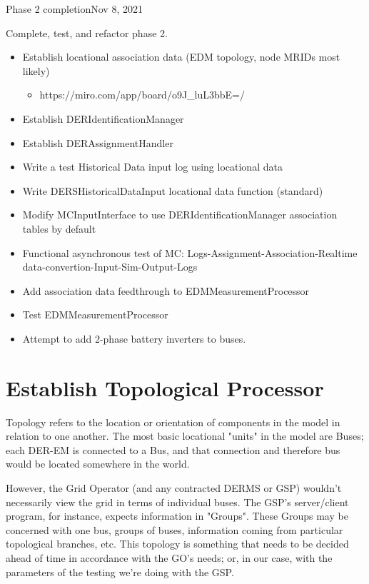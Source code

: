 \begin{entry}{Phase 2 completion}{Nov 8, 2021}
    \objective 
    
    Complete, test, and refactor phase 2.


    \outline

    \begin{itemize}
        \item Establish locational association data (EDM topology, node MRIDs most likely)
        \begin{itemize}
            \item https://miro.com/app/board/o9J_luL3bbE=/
        \end{itemize}
        \item Establish DERIdentificationManager
        \item Establish DERAssignmentHandler
        \item Write a test Historical Data input log using locational data
        \item Write DERSHistoricalDataInput locational data function (standard)
        \item Modify MCInputInterface to use DERIdentificationManager association tables by default
        \item Functional asynchronous test of MC: Logs-Assignment-Association-Realtime data-convertion-Input-Sim-Output-Logs
        \item Add association data feedthrough to EDMMeasurementProcessor
        \item Test EDMMeasurementProcessor
        \item Attempt to add 2-phase battery inverters to buses.
    \end{itemize}

    \procedures

    \section*{Establish Topological Processor}
    Topology refers to the location or orientation of components in the model in relation to one another. The most basic
    locational "units" in the model are Buses; each DER-EM is connected to a Bus, and that connection and therefore bus
    would be located somewhere in the world.

    However, the Grid Operator (and any contracted DERMS or GSP) wouldn't necessarily view the grid in terms of
    individual buses. The GSP's server/client program, for instance, expects information in "Groups". These Groups may
    be concerned with one bus, groups of buses, information coming from particular topological branches, etc. This
    topology is something that needs to be decided ahead of time in accordance with the GO's needs; or, in our case,
    with the parameters of the testing we're doing with the GSP.


\end{entry}
